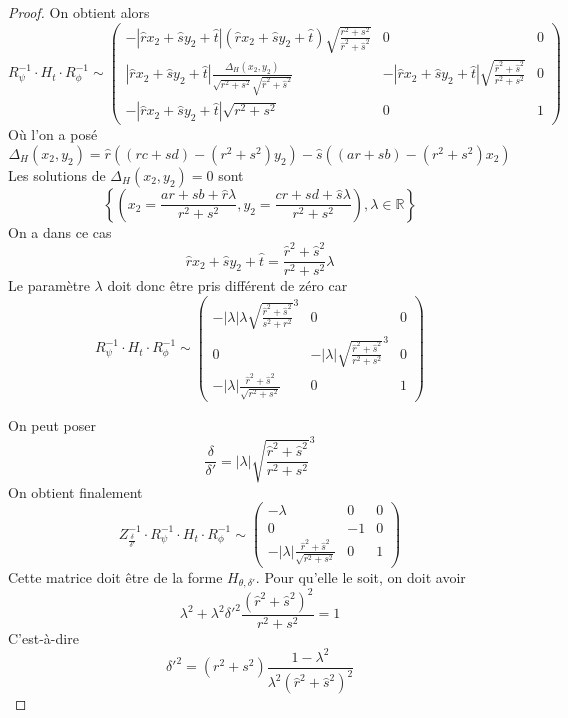 \begin{proof}
 On obtient alors 
\begin{equation*}
R_{\psi}^{-1} \cdot H_t \cdot R_{\phi}^{-1} \sim 
 \begin{pmatrix}
 -|\hat r x_2 +\hat s y_2 +\hat t|(\hat r x_2 +\hat s y_2 +\hat t)\sqrt{\frac{r^2 + s^2}{\hat r^2 + \hat s^2}}&0&0\\
 |\hat r x_2 +\hat s y_2 +\hat t|\frac{\Delta_H(x_2 , y_2)}{\sqrt{r^2 + s^2}\sqrt{\hat r^2 + \hat s^2}}&-|\hat r x_2 +\hat s y_2 +\hat t|\sqrt{\frac{\hat r^2 + \hat s^2}{r^2 + s^2}}&0\\
 -|\hat r x_2 +\hat s y_2 +\hat t|\sqrt{r^2 + s^2}&0&1
 \end{pmatrix}
\end{equation*}
Où l'on a posé 
\begin{equation*}
\Delta_H(x_2 , y_2 ) =\hat r ((rc+sd)-(r^2 + s^2)y_2) - \hat s ((ar+sb)-(r^2 + s^2 )x_2)
\end{equation*}
Les solutions de $\Delta_H(x_2 , y_2 )=0$ sont
\[ \left\lbrace \left( x_2=\frac{ar+sb+ \hat r \lambda}{r^2 +s^2}, y_2=\frac{cr+sd+\hat s \lambda}{r^2 +s^2}\right), \lambda \in \mathbb R \right\rbrace\]
On a dans ce cas
\begin{equation*}
\hat r x_2 +\hat s y_2 +\hat t = \frac{\hat r^2 +\hat s^2}{r^2 + s^2} \lambda
\end{equation*}
Le paramètre $\lambda$ doit donc être pris différent de zéro car 
\begin{equation*}
R_{\psi}^{-1} \cdot H_t \cdot R_{\phi}^{-1} \sim 
 \begin{pmatrix}
 -| \lambda | \lambda \sqrt{\frac{\hat r^2 + \hat s^2}{s^2 + r^2}}^{3}&0&0\\
0&-| \lambda | \sqrt{\frac{\hat r^2 + \hat s^2}{r^2 + s^2}}^{3}&0\\
 -|\lambda|\frac{\hat r^2 + \hat s^2}{\sqrt{r^2 + s^2}}&0&1
 \end{pmatrix}
\end{equation*}
 
 
 On peut poser 
 \begin{equation*}
 \frac{\delta}{\delta'}=|\lambda|\sqrt{\frac{\hat r^2 + \hat s^2}{r^2 + s^2}}^{3}
 \end{equation*}
On obtient finalement
\begin{equation*}
Z_{\frac{\delta}{\delta'}}^{-1} \cdot R_{\psi}^{-1} \cdot H_t \cdot R_{\phi}^{-1} \sim 
 \begin{pmatrix}
 -\lambda&0&0\\
0&-1&0\\
 -|\lambda|\frac{\hat r^2 + \hat s^2}{\sqrt{r^2 + s^2}}&0&1
 \end{pmatrix}
 \end{equation*}
 Cette matrice doit être de la forme $H_{\theta,\delta'}$. Pour qu'elle le soit, on doit avoir 
 \begin{equation*}
  \lambda^2 + \lambda^2 \delta'^2 \frac{(\hat r^2 + \hat s^2)^2}{r^2 + s^2}=1
 \end{equation*}
 C'est-à-dire
 \begin{equation*}
  \delta'^2 = (r^2 + s^2) \frac{1-\lambda^2}{\lambda^2 (\hat r^2+\hat s^2)^2}
 \end{equation*}
\end{proof}
